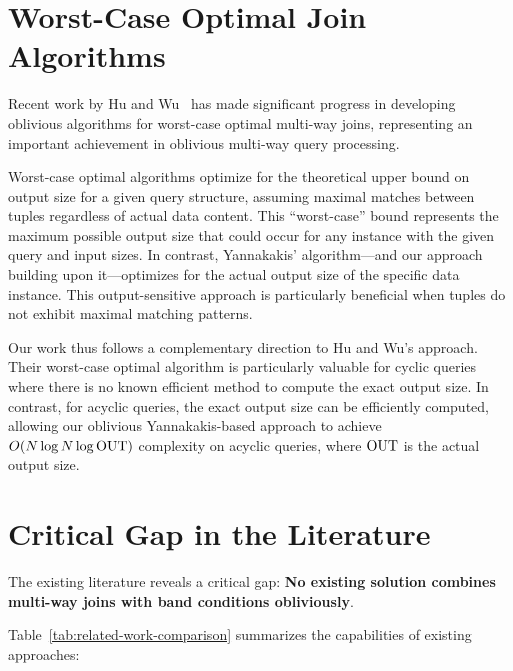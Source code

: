 \section{Worst-Case Optimal Join Algorithms}

Recent work by Hu and Wu~\cite{hu2025optimal} has made significant progress in developing oblivious algorithms for worst-case optimal multi-way joins, representing an important achievement in oblivious multi-way query processing.

Worst-case optimal algorithms optimize for the theoretical upper bound on output size for a given query structure, assuming maximal matches between tuples regardless of actual data content. This ``worst-case'' bound represents the maximum possible output size that could occur for any instance with the given query and input sizes. In contrast, Yannakakis' algorithm---and our approach building upon it---optimizes for the actual output size of the specific data instance. This output-sensitive approach is particularly beneficial when tuples do not exhibit maximal matching patterns.

Our work thus follows a complementary direction to Hu and Wu's approach. Their worst-case optimal algorithm is particularly valuable for cyclic queries where there is no known efficient method to compute the exact output size. In contrast, for acyclic queries, the exact output size can be efficiently computed, allowing our oblivious Yannakakis-based approach to achieve $O(N \log N \log \text{OUT})$ complexity on acyclic queries, where $\text{OUT}$ is the actual output size.

\section{Critical Gap in the Literature}

The existing literature reveals a critical gap: \textbf{No existing solution combines multi-way joins with band conditions obliviously}. 

Table~\ref{tab:related-work-comparison} summarizes the capabilities of existing approaches:

